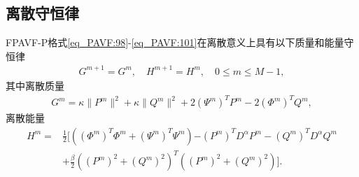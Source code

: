 \subsection{离散守恒律}
\begin{theorem}\label{thm_PAVF:4}
FPAVF-P格式\eqref{eq_PAVF:98}-\eqref{eq_PAVF:101}在离散意义上具有以下质量和能量守恒律
\begin{align}\label{eq_PAVF:11141}
G^{m+1}=G^{m}, \quad H^{m+1}=H^{m}, \quad 0 \leq m \leq M-1,
\end{align}
其中离散质量
\begin{align}\label{eq_PAVF:11142}
G^{m}=\kappa\|P^{m}\|^2+\kappa\|Q^{m}\|^2+2 \left(\Psi^{m}\right)^T P^{m}-2 \left(\varPhi^{m}\right)^T Q^{m},
\end{align}
离散能量
\begin{align}
H^{m}=&\frac{1}{2}[((\varPhi^{m})^{T}\varPhi^{m}+(\Psi^{m})^{T}\Psi^{m}){-(P^{m})^{T} D^{\alpha} P^{m}-(Q^{m})^{T} D^{\alpha} Q^{m}}\nonumber\\
&+\frac{\beta}{2}((P^{m})^2+(Q^{m})^2)^{T}((P^{m})^2+(Q^{m})^2)].\label{eq_PAVF:800}
\end{align}
\end{theorem}

